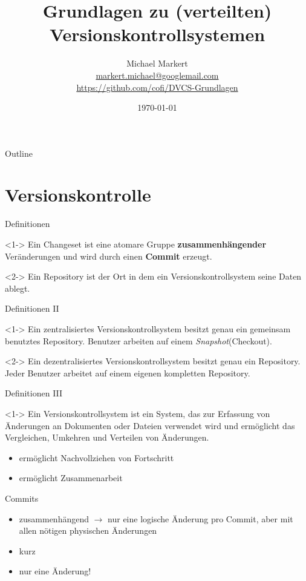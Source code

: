 \documentclass[presentation]{beamer}
\title{Grundlagen zu (verteilten) Versionskontrollsystemen}
\author[Michael Markert]{Michael Markert\\
  \href{mailto:markert.michael@googlemail.com}{markert.michael@googlemail.com}\\
  \url{https://github.com/cofi/DVCS-Grundlagen}}
\date{\today}
\begin{document}
\begin{frame}[plain]
  \titlepage
\end{frame}

\begin{frame}{Outline}
  \setcounter{tocdepth}{1}
  \tableofcontents
\end{frame}
\section{Versionskontrolle}
\begin{frame}{Definitionen}
  \begin{definition}<1->
    Ein \alert{Changeset} ist eine atomare Gruppe \textbf{zusammenhängender}
    Veränderungen und wird durch einen \textbf{Commit} erzeugt.
  \end{definition}
  \begin{definition}<2->
    Ein \alert{Repository} ist der Ort in dem ein Versionskontrollsystem seine
    Daten ablegt.
  \end{definition}
\end{frame}
\begin{frame}{Definitionen II}
  \begin{definition}<1->
    Ein \alert{zentralisiertes Versionskontrollsystem} besitzt genau ein
    gemeinsam benutztes Repository. Benutzer arbeiten auf einem
    \emph{Snapshot}(Checkout).
  \end{definition}
  \begin{definition}<2->
    Ein \alert{dezentralisiertes Versionskontrollsystem} besitzt genau ein
    Repository. Jeder Benutzer arbeitet auf einem eigenen kompletten Repository.
  \end{definition}
\end{frame}
\begin{frame}{Definitionen III}
  \begin{definition}<1->
    Ein \alert{Versionskontrollsystem} ist ein System, das zur Erfassung von
    Änderungen an Dokumenten oder Dateien verwendet wird und ermöglicht das
    Vergleichen, Umkehren und Verteilen von Änderungen.
  \end{definition}
  \begin{itemize}
  \item<2-> ermöglicht Nachvollziehen von Fortschritt
  \item<3-> ermöglicht Zusammenarbeit
  \end{itemize}
\end{frame}
\begin{frame}{Commits}
  \begin{itemize}[<+->]
  \item zusammenhängend $\rightarrow$ nur eine logische Änderung pro Commit,
    aber mit allen nötigen physischen Änderungen
  \item kurz
  \item nur eine Änderung!
  \end{itemize}
\end{frame}
\end{document}

